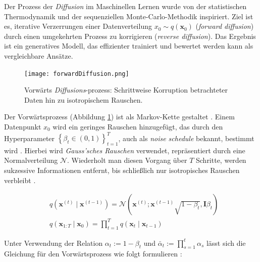 \documentclass[
  a4paper,  %
  twoside,  %
  bibliography=totoc,
  headsepline,
  cleardoublepage=empty,
  parskip=half,
  draft=false
]{scrbook}
\begin{document}
Der Prozess der \emph{Diffusion} im Maschinellen Lernen \cite{sohl-dickstein_deep_2015, ho_denoising_2020, nichol_improved_2021, dhariwal_diffusion_2021} wurde von der statistischen Thermodynamik \cite{jarzynski_equilibrium_1997} und der sequenziellen Monte-Carlo-Methodik \cite{neal_annealed_1998} inspiriert. Ziel ist es, iterative Verzerrungen einer Datenverteilung $x_0\sim q(\mathbf{x}_0)$ (\emph{forward diffusion}) durch einen umgekehrten Prozess zu korrigieren (\emph{reverse diffusion}). Das Ergebnis ist ein generatives Modell, das effizienter trainiert und bewertet werden kann als vergleichbare Ansätze. \cite{sohl-dickstein_deep_2015, nichol_improved_2021}

\begin{figure}[h]
  \centering
  \texttt{[image: forwardDiffusion.png]}
  \caption[Vorwärtsprozess Diffusion]{Vorwärts \emph{Diffusions}-prozess: Schrittweise Korruption betrachteter Daten hin zu isotropischem Rauschen. \cite{machine_learning_at_berkeley_diffusion_2022}}
  \label{fig:forwardDiffusion}
\end{figure} 

Der Vorwärtsprozess (Abbildung \ref{fig:forwardDiffusion}) ist als Markov-Kette gestaltet \cite{sohl-dickstein_deep_2015, ho_denoising_2020}. Einem Datenpunkt $x_0$ wird ein geringes Rauschen hinzugefügt, das durch den Hyperparameter $\left\{\beta_t \in(0,1)\right\}_{t=1}^T$, auch als \emph{noise schedule} bekannt, bestimmt wird \cite{ho_denoising_2020, machine_learning_at_berkeley_diffusion_2022}. Hierbei wird \emph{Gauss'sches Rauschen} \cite{shannon_communication_1949} verwendet, repräsentiert durch eine Normalverteilung $\mathcal{N}$. Wiederholt man diesen Vorgang über $T$ Schritte, werden sukzessive Informationen entfernt, bis schließlich nur isotropisches Rauschen verbleibt \cite{machine_learning_at_berkeley_diffusion_2022}.

\begin{align}
   & q\left(\mathbf{x}^{(t)} \mid \mathbf{x}^{(t-1)}\right) = \mathcal{N}\left(\mathbf{x}^{(t)} ; \mathbf{x}^{(t-1)} \sqrt{1-\beta_t}, \mathbf{I} \beta_t\right) \\
   & q\left(\mathbf{x}_{1: T} \mid \mathbf{x}_0\right)=\prod_{t=1}^T q\left(\mathbf{x}_t \mid \mathbf{x}_{t-1}\right)
\end{align}

Unter Verwendung der Relation \( \alpha_t:=1-\beta_t \) und \( \bar{\alpha}_t:=\prod_{s=1}^t \alpha_s \) lässt sich die Gleichung für den Vorwärtsprozess wie folgt formulieren \cite{ho_denoising_2020}: 
\end{document}
